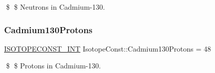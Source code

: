 \$ \$ Neutrons in Cadmium-\/130. \mbox{\label{group___isotope_const-_cadmium-_cd130_ga5b8234c01437195f8fe9cbf0a4318621}} 
\subsubsection{\texorpdfstring{Cadmium130\+Protons}{Cadmium130Protons}}
{\footnotesize\ttfamily \mbox{\hyperlink{group___isotope_const-_macros_ga5f18360b3e99483a35c32d789e62621c}{I\+S\+O\+T\+O\+P\+E\+C\+O\+N\+S\+T\+\_\+\+I\+NT}} Isotope\+Const\+::\+Cadmium130\+Protons = 48}

\$ \$ Protons in Cadmium-\/130. 